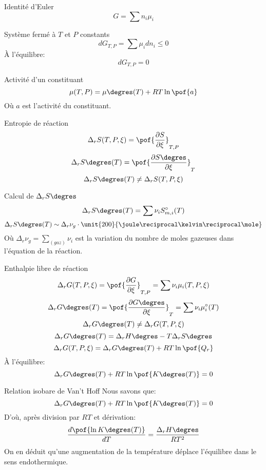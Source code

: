\documentclass[french, a4paper, 11pt, twocolumn]{article}
\newcommand{\drz}[1]{\Delta_r#1\degres}
\begin{document}
\begin{cadre}{Identité d'Euler}
  \[G = \sum n_{i}\mu_{i}\]
\end{cadre}

\begin{cadre}{Système fermé à $T$ et $P$ constants}
  \[dG_{T,P} = \sum \mu_{i}dn_{i} \leq 0\]
  À l'équilibre:
  \[dG_{T,P} = 0\]
\end{cadre}

\begin{cadre}{Activité d'un constituant}
  \[\mu(T,P) = \mu\degres(T) + RT\ln\pof{a}\]
  Où $a$ est l'activité du constituant.
\end{cadre}

\begin{cadre}{Entropie de réaction}
  \[\Delta_{r}S(T, P, \xi) = \pof{\dfrac{\partial S}{\partial \xi}}_{T,P}\]
  \[\drz{S}(T) = \pof{\dfrac{\partial S\degres}{\partial \xi}}_{T}\]
  \[\drz{S}(T) \neq \Delta_{r}S(T,P,\xi)\]
\end{cadre}

\begin{cadre}{Calcul de $\drz{S}$}
  \[\drz{S}(T) = \sum \nu_{i}S_{m,i}^{\circ}(T)\]
  \[\drz{S}(T) \sim \Delta_{r}\nu_{g}\cdot \unit{200}{\joule\reciprocal\kelvin\reciprocal\mole}\]
  Où $\Delta_{r}\nu_{g}=\sum_{(gaz)}\nu_{i}$ est la variation du nombre de moles gazeuses dans l'équation de la réaction.
\end{cadre}

\begin{cadre}{Enthalpie libre de réaction}
  \[\Delta_{r}G(T, P, \xi) = \pof{\dfrac{\partial G}{\partial \xi}}_{T,P} = \sum \nu_{i}\mu_{i}(T,P,\xi)\]
  \[\drz{G}(T) = \pof{\dfrac{\partial G\degres}{\partial \xi}}_{T} = \sum \nu_{i}\mu_{i}^{\circ}(T)\]
  \[\drz{G}(T) \neq \Delta_{r}G(T,P,\xi)\]
  \[\drz{G}(T) = \drz{H} - T\drz{S}\]
  \[\Delta_{r}G(T, P, \xi) = \drz{G}(T) + RT\ln\pof{Q_{r}}\]
  À l'équilibre:
  \[\drz{G}(T) + RT\ln\pof{K\degres(T)} = 0\]
\end{cadre}

\begin{cadre}{Relation isobare de Van't Hoff}
  Nous savons que:
  \[\drz{G}(T) + RT\ln\pof{K\degres(T)} = 0\]
  D'où, après division par $RT$ et dérivation:
  \[\dfrac{d\pof{\ln K\degres(T)}}{dT} = \dfrac{\drz{H}}{RT^{2}}\]
  On en déduit qu'une augmentation de la température déplace l'équilibre dans le sens endothermique.
\end{cadre}
\end{document}
